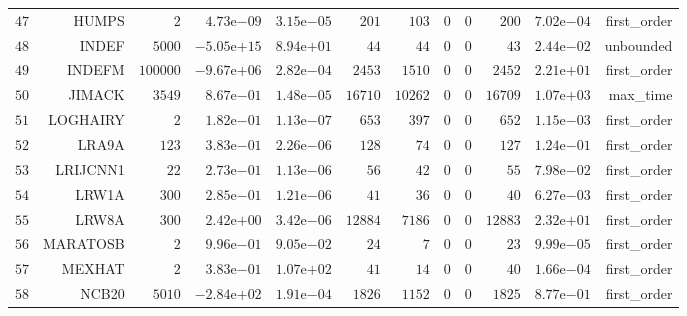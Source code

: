 \begin{longtable}{rrrrrrrrrrrr}
  \(    47\) & HUMPS & \(     2\) & \( 4.73\)e\(-09\) & \( 3.15\)e\(-05\) & \(   201\) & \(   103\) & \(     0\) & \(     0\) & \(   200\) & \( 7.02\)e\(-04\) & first\_order \\
  \(    48\) & INDEF & \(  5000\) & \(-5.05\)e\(+15\) & \( 8.94\)e\(+01\) & \(    44\) & \(    44\) & \(     0\) & \(     0\) & \(    43\) & \( 2.44\)e\(-02\) & unbounded \\
  \(    49\) & INDEFM & \(100000\) & \(-9.67\)e\(+06\) & \( 2.82\)e\(-04\) & \(  2453\) & \(  1510\) & \(     0\) & \(     0\) & \(  2452\) & \( 2.21\)e\(+01\) & first\_order \\
  \(    50\) & JIMACK & \(  3549\) & \( 8.67\)e\(-01\) & \( 1.48\)e\(-05\) & \( 16710\) & \( 10262\) & \(     0\) & \(     0\) & \( 16709\) & \( 1.07\)e\(+03\) & max\_time \\
  \(    51\) & LOGHAIRY & \(     2\) & \( 1.82\)e\(-01\) & \( 1.13\)e\(-07\) & \(   653\) & \(   397\) & \(     0\) & \(     0\) & \(   652\) & \( 1.15\)e\(-03\) & first\_order \\
  \(    52\) & LRA9A & \(   123\) & \( 3.83\)e\(-01\) & \( 2.26\)e\(-06\) & \(   128\) & \(    74\) & \(     0\) & \(     0\) & \(   127\) & \( 1.24\)e\(-01\) & first\_order \\
  \(    53\) & LRIJCNN1 & \(    22\) & \( 2.73\)e\(-01\) & \( 1.13\)e\(-06\) & \(    56\) & \(    42\) & \(     0\) & \(     0\) & \(    55\) & \( 7.98\)e\(-02\) & first\_order \\
  \(    54\) & LRW1A & \(   300\) & \( 2.85\)e\(-01\) & \( 1.21\)e\(-06\) & \(    41\) & \(    36\) & \(     0\) & \(     0\) & \(    40\) & \( 6.27\)e\(-03\) & first\_order \\
  \(    55\) & LRW8A & \(   300\) & \( 2.42\)e\(+00\) & \( 3.42\)e\(-06\) & \( 12884\) & \(  7186\) & \(     0\) & \(     0\) & \( 12883\) & \( 2.32\)e\(+01\) & first\_order \\
  \(    56\) & MARATOSB & \(     2\) & \( 9.96\)e\(-01\) & \( 9.05\)e\(-02\) & \(    24\) & \(     7\) & \(     0\) & \(     0\) & \(    23\) & \( 9.99\)e\(-05\) & first\_order \\
  \(    57\) & MEXHAT & \(     2\) & \( 3.83\)e\(-01\) & \( 1.07\)e\(+02\) & \(    41\) & \(    14\) & \(     0\) & \(     0\) & \(    40\) & \( 1.66\)e\(-04\) & first\_order \\
  \(    58\) & NCB20 & \(  5010\) & \(-2.84\)e\(+02\) & \( 1.91\)e\(-04\) & \(  1826\) & \(  1152\) & \(     0\) & \(     0\) & \(  1825\) & \( 8.77\)e\(-01\) & first\_order \\

\end{longtable}
